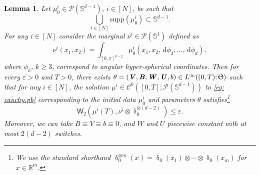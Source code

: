 \documentclass[a4paper,11pt]{article}
\theoremstyle{plain}
\newtheorem{lemma}[theorem]{Lemma}
\newcommand{\R}{\mathbb{R}}
\newcommand{\diff}{\, \mathrm{d}}
\renewcommand{\S}{\mathbb{S}^{d-1}}
\newcommand{\bW}{\bm{\mathit{W}}}
\newcommand{\bV}{\bm{\mathit{V}}}
\newcommand{\bB}{\bm{\mathit{B}}}
\newcommand{\bU}{\bm{\mathit{U}}}
\renewcommand{\leq}{\leqslant}
\renewcommand{\geq}{\geqslant}
\numberwithin{equation}{section}
\begin{document}
\begin{lemma}\label{lem: squashing.lemma}
Let $\mu_0^i\in \mathscr{P}(\S)$, $i\in[N]$, be such that 
\begin{equation*}
\bigcup_{i\in[N]}\mathrm{supp}\left(\mu^i_0\right)\subset\S.
\end{equation*}
For any $i\in[N]$ consider the marginal $\nu^i\in \mathscr{P}(\mathbb{S}^1)$ defined as 
\begin{equation*}
\nu^i(x_1,x_2)=\int_{[0,\pi]^{d-2}}\mu_0^i(x_1,x_2,\diff\phi_3,\ldots,\diff\phi_d),
\end{equation*}
where $\phi_k$, $k\geq 3$, correspond to angular hyper-spherical coordinates. Then for every $\varepsilon>0$ and $T>0$, there exists $\theta=(\bV,\bB,\bW,\bU,b)\in L^\infty((0,T);\Uptheta)$ such that for any $i\in[N]$, the solution $\mu^i\in \mathscr{C}^0([0,T];\mathscr{P}(\S))$ to \eqref{eq: cauchy.pb} corresponding to the initial data $\mu_0^i$ and parameters $\theta$ satisfies\footnote{We use the standard shorthand $\updelta^{\otimes m}_0(x) = \updelta_0(x_1)\otimes\cdots\otimes\updelta_0(x_m)$ for $x\in\R^m$.}
\begin{equation*}
\mathsf{W}_2\left(\mu^i(T),\nu^i\otimes \updelta_0^{\otimes (d-2)}\right)\leq\varepsilon.
\end{equation*}
Moreover, we can take $\bB\equiv\bV\equiv b\equiv0$, and $\bW$ and $\bU$ piecewise constant with at most $2(d-2)$ switches.
\end{lemma}
\end{document}
